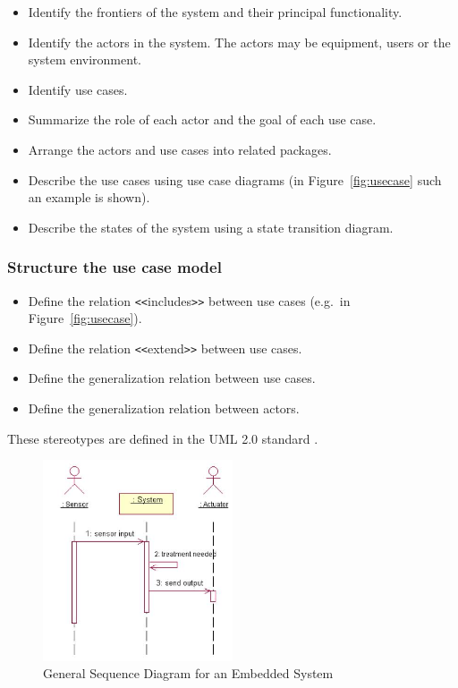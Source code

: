 \documentclass{overturerepchap}
\begin{document}
\begin{itemize}
\item Identify the frontiers of the system and their principal functionality.
\item Identify the actors in the system. The actors may be equipment,
users or the system environment.
\item Identify use cases.
\item Summarize the role of each actor and the goal of each use case.
\item Arrange the actors and use cases into related packages.
\item Describe the use cases using use case diagrams (in
Figure~\ref{fig:usecase} such an example is shown).
\item Describe the states of the system using a state transition diagram.
\end{itemize}

\subsubsection{Structure the use case model}

\begin{itemize}
\item Define the relation {\tt <<}includes{\tt >>} between use cases
(e.g.\ in Figure~\ref{fig:usecase}).
\item Define the relation {\tt <<}extend{\tt >>} between use cases.
\item Define the generalization relation between use cases.
\item Define the generalization relation between actors.
\end{itemize}

These stereotypes are defined in the UML 2.0 standard \cite{UML20}.

\begin{figure}
\begin{center}
\includegraphics[width=0.5\textwidth]{figures/generalseqdia2.jpg}
\end{center}
\caption{General Sequence Diagram for an Embedded System}\label{fig:seqdiag}
\end{figure}
\end{document}
